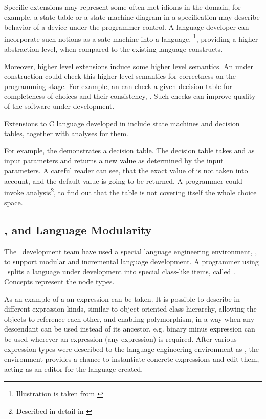 Specific extensions may represent some often met idioms in the domain, for example, 
a state table or  a state machine diagram in a specification may describe behavior of a device under the 
programmer control. A language developer can incorporate such notions as a sate machine into a language, \footnote{Illustration is taken from \cite{2012_ratiu_modular_dsls_and_analyses} }, 
providing a higher abstraction level, when compared to the existing language constructs. 


Moreover, higher level extensions induce some higher level semantics. An  under construction could check 
this higher level semantics for correctness on the programming stage. For example, an  can check a given decision table 
for completeness of choices and their consistency, \cite{2012_ratiu_modular_dsls_and_analyses}. Such checks can improve 
quality of the software under development. 

Extensions to C language developed in  include state machines and decision tables, together with analyses
for them.

For example, the  demonstrates a decision table. The decision table takes  and  as input parameters
and returns a new  value as determined by the input parameters. A careful reader can see, that the exact value  of 
is not taken into account, and the default value  is going to be returned. A programmer could invoke analysis\footnote{Described in detail 
in  \cite{2012_ratiu_modular_dsls_and_analyses}}, to find out that the table is not covering itself the whole choice space.

\subsection{\jbmps, \mbdr and Language Modularity}

The \mbdr\ development team have used a special language engineering environment, , to support modular and incremental 
language development.  A programmer using \jbmps\ splits a language under development into special class-like items, 
called . Concepts represent the  node types. 

As an example of a  an expression can be taken. It is possible to describe in  different 
expression kinds, similar to object oriented class hierarchy, allowing the objects to reference each other, 
and enabling polymorphism, in a way when any descendant can be used instead of its ancestor, e.g. 
binary minus expression can be used wherever an expression (any expression) is required. 
After various expression types were described to the language engineering environment as , 
the environment provides a chance to instantiate concrete expressions and edit them, acting as an editor for 
the language created.

